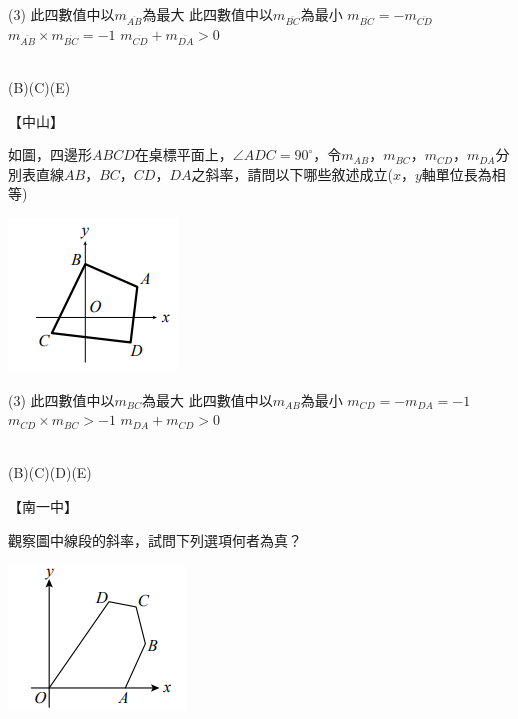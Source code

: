 \documentclass
[answers]
{exam}
\theoremstyle{definition}
\begin{document}
\begin{questions}
\begin{tasks}(3)
	\task 此四數值中以$m_{\overline{AB}}$為最大
	\task 此四數值中以$m_{\overline{BC}}$為最小
	\task $m_{\overline{BC}} = -m_{\overline{CD}}$
	\task $m_{\overline{AB}} \times m_{\overline{BC}} = -1$
	\task $m_{\overline{CD}} + m_{\overline{DA}} > 0$
\end{tasks}

\begin{solution}~\\
	(B)(C)(E)
\end{solution}

\question
【中山】\\
\begin{minipage}[t]{0.7\linewidth}
	如圖，四邊形$ABCD$在桌標平面上，$\angle ADC = 90^{\circ}$，令$m_{AB}$，$m_{BC}$，$m_{CD}$，$m_{DA}$分別表直線$AB$，$BC$，$CD$，$DA$之斜率，請問以下哪些敘述成立($x$，$y$軸單位長為相等)
\end{minipage}
\hfill
\begin{minipage}[t]{0.3\linewidth}
	\vspace*{-0.3cm}
	\includegraphics[scale=1]{./figure/3.png}
	\raggedleft %
\end{minipage}

\begin{tasks}(3)
	\task 此四數值中以$m_{BC}$為最大
	\task 此四數值中以$m_{AB}$為最小
	\task $m_{CD} = -m_{DA}= -1$
	\task $m_{CD} \times m_{BC} > -1$
	\task $m_{DA} + m_{CD} > 0$
\end{tasks}

\begin{solution}~\\
	(B)(C)(D)(E)
\end{solution}


\question
【南一中】\\
\begin{minipage}[t]{0.7\linewidth}
	觀察圖中線段的斜率，試問下列選項何者為真？
\end{minipage}
\hfill
\begin{minipage}[t]{0.3\linewidth}
	\vspace*{-0.3cm}
	\includegraphics[scale=1]{./figure/4.png}
	\raggedleft %
\end{minipage}


\end{questions}
\end{document}
